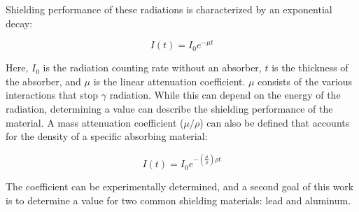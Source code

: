 Shielding performance of these radiations is characterized by an exponential decay:

\begin{equation}
I(t) = I_{0}e^{-\mu t}
\end{equation}

Here, $I_{0}$ is the radiation counting rate without an absorber, $t$ is the thickness of the absorber, and $\mu$ is the linear attenuation coefficient. $\mu$ consists of the various interactions that stop $\gamma$ radiation. While this can depend on the energy of the radiation, determining a value can describe the shielding performance of the material. A mass attenuation coefficient ($\mu/\rho$) can also be defined that accounts for the density of a specific absorbing material:

\begin{equation}
I(t) = I_{0}e^{-(\frac{\mu}{\rho})\rho t}
\label{eq:decay}
\end{equation}

The coefficient can be experimentally determined, and a second goal of this work is to determine a value for two common shielding materials: lead and aluminum.
